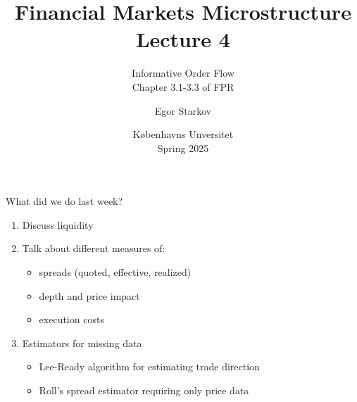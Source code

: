 \documentclass[english,10pt
,aspectratio=169
]{beamer}
\title{Financial Markets Microstructure \\ Lecture 4}
\subtitle{Informative Order Flow\\
	Chapter 3.1-3.3 of FPR}
\author{Egor Starkov}
\date{K{\o}benhavns Unversitet \\
	Spring 2025}
\begin{document}
\frame[plain]{\titlepage}


\begin{frame}{What did we do last week?}
\begin{enumerate}
	\item Discuss liquidity
	\item Talk about different measures of:
	\begin{itemize}
		\item spreads (quoted, effective, realized)
		\item depth and price impact
		\item execution costs
	\end{itemize}
	\item Estimators for missing data
	\begin{itemize}
		\item Lee-Ready algorithm for estimating trade direction
		\item Roll's spread estimator requiring only price data
	\end{itemize}
\end{enumerate}
\end{frame}


\end{document}
